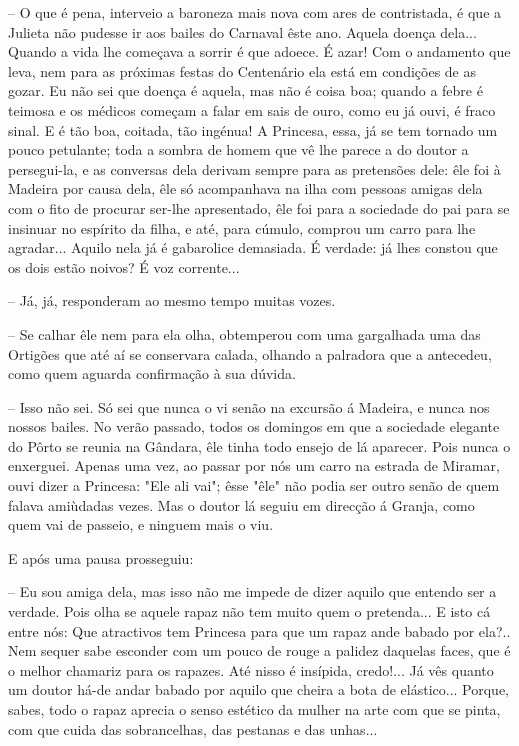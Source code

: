 \documentclass[9pt]{article}
\begin{document}
-- O que é pena, interveio a baroneza mais nova com ares de contristada, é que a Julieta não pudesse ir aos bailes do Carnaval êste ano.
Aquela doença dela... Quan\-do a vida lhe começava a sorrir é que adoece. É
azar! Com o andamento que leva, nem para as próximas festas do Centenário ela está em condi\-ções de as gozar. Eu não sei que doença é aquela,
mas não é coisa boa; quan\-do a febre é teimosa e os médicos começam a
falar em sais de ouro, como eu já ouvi, é fraco sinal. E é tão boa, coitada,
tão ingénua! A Princesa, essa, já se tem tornado um pouco petulante; toda
a sombra de homem que vê lhe parece a do doutor a persegui-la, e as conversas dela derivam sempre para as pretensões dele: êle foi à Madeira
por causa dela, êle só acompanhava na i\-lha com pessoas amigas dela com
o fito de procurar ser-\-lhe apresentado, êle foi para a sociedade do pai
para se insinuar no espírito da fi\-lha, e até, para cúmulo, comprou um carro
para lhe agradar... Aquilo nela já é gabarolice demasiada. É verdade:
já lhes constou que os dois estão noivos? É voz corrente...

-- Já, já, responderam ao mesmo tempo muitas vozes.

-- Se ca\-lhar êle nem para ela o\-lha, obtemperou com uma garga\-lhada
uma das Ortigões que até aí se conservara calada, o\-lhando a palradora que
a antecedeu, como quem aguarda confirma\-ção à sua dúvida.

-- Isso não sei. Só sei que nunca o vi senão na excursão á Madeira,
e nunca nos nossos bailes. No verão passado, todos os domingos em que a
sociedade elegante do Pôrto se reunia na Gândara, êle tinha todo ensejo
de lá aparecer. Pois nunca o enxerguei. Apenas uma vez, ao passar por
nós um carro na estrada de Miramar, ouvi dizer a Princesa: "Ele ali vai";
êsse "êle" não podia ser outro senão de quem falava amiùdadas vezes. Mas
o doutor lá seguiu em direc\-ção á Granja, como quem vai de passeio, e ninguem mais o viu.

E após uma pausa prosseguiu:

-- Eu sou amiga dela, mas isso não me impede de dizer aquilo que entendo ser a verdade. Pois o\-lha se aquele rapaz não tem muito quem o pretenda... E isto cá entre nós: Que atractivos tem Princesa para que um
rapaz ande babado por ela?.. Nem sequer sabe esconder com um pouco de
rouge a palidez daquelas faces, que é o me\-lhor chamariz para os rapazes.
Até nisso é insípida, credo!... Já vês quanto um doutor há-de andar
babado por aquilo que cheira a bota de elástico... Porque, sabes, todo
o rapaz aprecia o senso estético da mu\-lher na arte com que se pinta, com
que cuida das sobrance\-lhas, das pestanas e das unhas...
\end{document}
